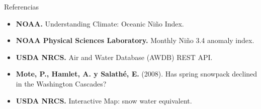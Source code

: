 \documentclass[aspectratio=169]{beamer}
\begin{document}
\begin{frame}{Referencias}
\begin{itemize}\setlength\itemsep{0.75em}
\item \textbf{NOAA.} Understanding Climate: Oceanic Niño Index.
\item \textbf{NOAA Physical Sciences Laboratory.} Monthly Niño 3.4 anomaly index.
\item \textbf{USDA NRCS.} Air and Water Database (AWDB) REST API.
\item \textbf{Mote, P., Hamlet, A. y Salathé, E.} (2008). Has spring snowpack declined in the Washington Cascades?
\item \textbf{USDA NRCS.} Interactive Map: snow water equivalent.
\end{itemize}
\end{frame}
\end{document}

